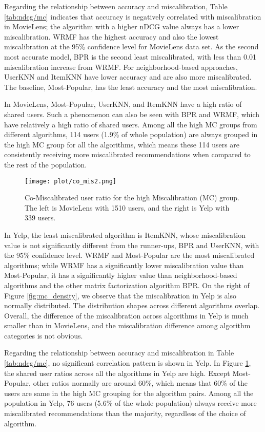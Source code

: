Regarding the relationship between accuracy and miscalibration, Table \ref{tab:ndcg/mc} indicates that accuracy is negatively correlated with miscalibration in MovieLens; the algorithm with a higher nDCG value always has a lower miscalibration. WRMF has the highest accuracy and also the lowest miscalibration at the 95\% confidence level for MovieLens data set. As the second most accurate model, BPR is the second least miscalibrated, with less than 0.01 miscalibration increase from WRMF. For neighborhood-based approaches, UserKNN and ItemKNN have lower accuracy and are also more miscalibrated. The baseline, Most-Popular, has the least accuracy and the most miscalibration. 

In MovieLens, Most-Popular, UserKNN, and ItemKNN have a high ratio of shared users. Such a phenomenon can also be seen with BPR and WRMF, which have relatively a high ratio of shared users. Among all the high MC groups from different algorithms, 114 users (1.9\% of whole population) are always grouped in the high MC group for all the algorithms, which means these 114 users are consistently receiving more miscalibrated recommendations when compared to the rest of the population. 

\begin{figure}[!hbtp]
    \texttt{[image: plot/co\_mis2.png]}
    \caption{Co-Miscalibrated user ratio for the high Miscalibration (MC) group. The left is MovieLens with 1510 users, and the right is Yelp with 339 users.}
    \label{fig:co_mis}
\end{figure}

In Yelp, the least miscalibrated algorithm is ItemKNN, whose miscalibration value is not significantly different from the runner-ups, BPR and UserKNN, with the 95\% confidence level. WRMF and Most-Popular are the most miscalibrated algorithms; while WRMF has a significantly lower miscalibration value than Most-Popular, it has a significantly higher value than neighborhood-based algorithms and the other matrix factorization algorithm BPR. On the right of Figure \ref{fig:mc_density}, we observe that the miscalibration in Yelp is also normally distributed. The distribution shapes across different algorithms overlap. Overall, the difference of the miscalibration across algorithms in Yelp is much smaller than in MovieLens, and the miscalibration difference among algorithm categories is not obvious. 

Regarding the relationship between accuracy and miscalibration in Table \ref{tab:ndcg/mc}, no significant correlation pattern is shown in Yelp. 
In Figure \ref{fig:co_mis}, the shared user ratios across all the algorithms in Yelp are high. Except Most-Popular, other ratios normally are around 60\%, which means that 60\% of the users are same in the high MC grouping for the algorithm pairs. Among all the population in Yelp, 76 users (5.6\% of the whole population) always receive more miscalibrated recommendations than the majority, regardless of the choice of algorithm. 

